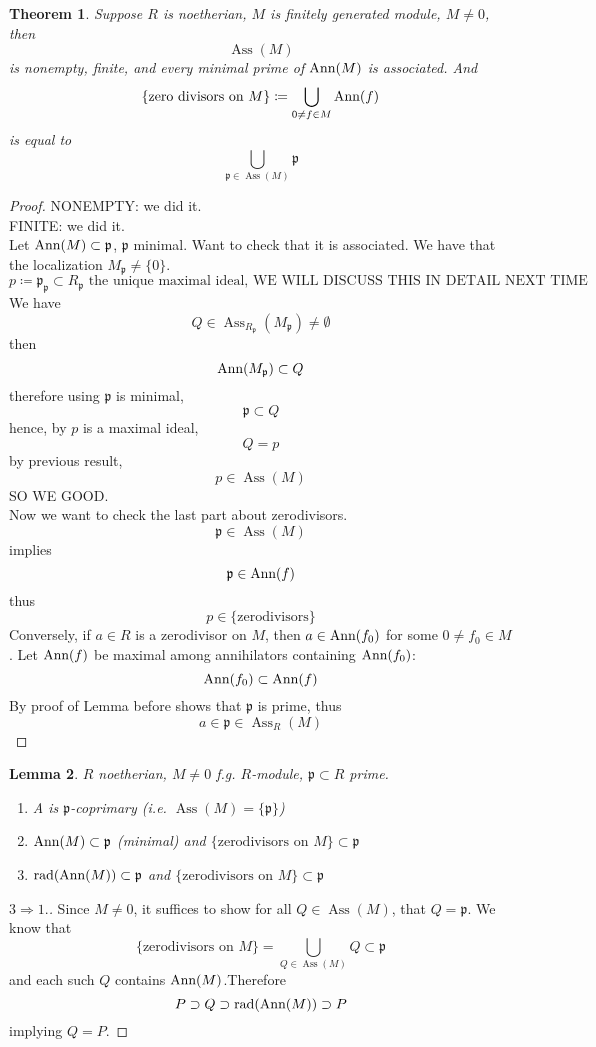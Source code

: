 \documentclass[12pt]{article}
\newcommand{\rad}{\textup{rad}}
\newcommand{\ann}[1]{\textup{Ann}(#1)}
\DeclareMathOperator{\Ass}{Ass}
\def\p{\mathfrak{p}}
\newtheorem{theorem}{Theorem}
\newtheorem{lemma}[theorem]{Lemma}
\theoremstyle{definition}
\begin{document}
\begin{theorem}
Suppose $R$ is noetherian, $M$ is finitely generated module, $M\neq 0$, then
\[
\Ass(M) 
\]
is nonempty, finite, and every minimal prime of $\ann{M}$ is associated. And
\[
\{\text{zero divisors on }M\} \coloneqq \bigcup_{0\neq f \in M} \ann{f}
\]
is equal to 
\[
\bigcup_{\p\in \Ass(M)}\p
\]
\end{theorem}
\begin{proof}
NONEMPTY: we did it.\\
FINITE: we did it.\\
Let $\ann{M} \subset \p $, $\p$ minimal. Want to check that it is associated. We have that the localization $M_\p \neq \{0\}$.
\[
p \coloneqq \p_\p \subset R_\p \text{ the unique maximal ideal, WE WILL DISCUSS THIS IN DETAIL NEXT TIME}
\]
We have
\[
Q \in \Ass_{R_\p} (M_\p) \neq \emptyset
\]
then
\[
\ann{M_\p} \subset Q
\]
therefore using $\p$ is minimal,
\[
\p \subset Q
\]
hence, by $p$ is a maximal ideal,
\[
Q = p
\]
by previous result,
\[
p\in \Ass(M)
\]
SO WE GOOD. \\
Now we want to check  the last part about zerodivisors. 
\[
\p \in \Ass(M) 
\]
implies
\[
\p \in \ann{f}
\]
thus
\[
p \in \{\text{zerodivisors}\}
\]
Conversely, if $a\in R$ is a zerodivisor on $M$, then $a\in \ann{f_0}$ for some $0\neq f_0\in M$. Let $\ann{f}$ be maximal among annihilators containing $\ann{f_0}$:
\[
\ann{f_0}\subset \ann{f}
\]
By proof of Lemma before shows that $\p$ is prime, thus 
\[
a\in \p \in \Ass_R(M)
\]

\end{proof}
\date{23.10.2018}
\begin{lemma}
$R$ noetherian, $M\neq 0$ f.g. $R$-module, $\p \subset R$ prime.
\begin{enumerate}
    \item A is $\p$-coprimary (i.e. $\Ass(M) = \{\p\}$)
    \item $\ann{M} \subset \p$ (minimal) and $\{\text{zerodivisors on } M\} \subset \p$
    \item $\rad(\ann{M}) \subset \p $ and $\{\text{zerodivisors on } M\} \subset \p$
\end{enumerate}
\end{lemma}
\begin{proof}[$3 \Rightarrow 1.$]
Since $M\neq 0$, it suffices to show for all $Q \in \Ass(M)$, that $Q = \p$. We know that 
\[
\{\text{zerodivisors on } M\}= \bigcup_{Q\in \Ass(M)} Q \subset \p
\]
and each such $Q$ contains $\ann{M}$.Therefore 
\[
P \supset Q \supset \rad(\ann{M}) \supset P
\]
implying $Q = P$.
\end{proof}
\end{document}
